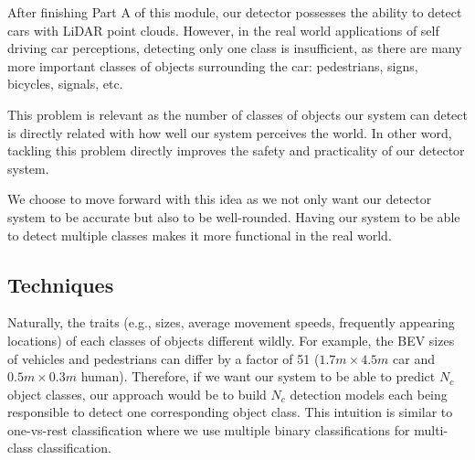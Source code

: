 \documentclass[letter]{article}
\begin{document}
    After finishing Part A of this module, our detector possesses the ability to detect cars with LiDAR point clouds. However, in the real world applications of self driving car perceptions, detecting only one class is insufficient, as there are many more important classes of objects surrounding the car: pedestrians, signs, bicycles, signals, etc. 
    
    This problem is relevant as the number of classes of objects our system can detect is directly related with how well our system perceives the world. In other word, tackling this problem directly improves the safety and practicality of our detector system. 

    We choose to move forward with this idea as we not only want our detector system to be accurate but also to be well-rounded. Having our system to be able to detect multiple classes makes it more functional in the real world. 

	\subsection{Techniques}

    Naturally, the traits (e.g., sizes, average movement speeds, frequently appearing locations) of each classes of objects different wildly. For example, the BEV sizes of vehicles and pedestrians can differ by a factor of 51 ($ 1.7m \times 4.5m $ car and $ 0.5m \times 0.3m $ human). Therefore, if we want our system to be able to predict $ N_c $ object classes, our approach would be to build $ N_c $ detection models each being responsible to detect one corresponding object class. This intuition is similar to one-vs-rest classification where we use multiple binary classifications for multi-class classification. 
\end{document}
